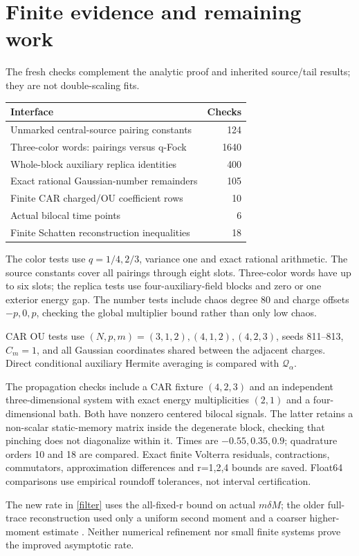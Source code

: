 \documentclass[11pt]{article}
\newcommand{\Qop}{\mathscr Q}
\begin{document}
\section{Finite evidence and remaining work}
The fresh checks complement the analytic proof and inherited
source/tail results; they are not double-scaling fits.
\begin{center}
\begin{tabular}{lr}\toprule
Interface&Checks\\\midrule
Unmarked central-source pairing constants&124\\
Three-color words: pairings versus q-Fock&1640\\
Whole-block auxiliary replica identities&400\\
Exact rational Gaussian-number remainders&105\\
Finite CAR charged/OU coefficient rows&10\\
Actual bilocal time points&6\\
Finite Schatten reconstruction inequalities&18\\\bottomrule
\end{tabular}
\end{center}
The color tests use $q=1/4,2/3$, variance one and exact rational
arithmetic. The source constants cover all pairings through
eight slots. Three-color words have up to six slots; the replica
tests use four-auxiliary-field blocks and zero or one exterior
energy gap. The number tests include chaos degree 80 and
charge offsets $-p,0,p$, checking the global multiplier bound
rather than only low chaos.

CAR OU tests use $(N,p,m)=(3,1,2),(4,1,2),(4,2,3)$,
seeds 811--813, $C_m=1$, and all Gaussian coordinates shared
between the adjacent charges. Direct conditional auxiliary
Hermite averaging is compared with $\Qop_\alpha$.

The propagation checks include a CAR fixture $(4,2,3)$ and
an independent three-dimensional system with exact energy
multiplicities $(2,1)$ and a four-dimensional bath. Both have
nonzero centered bilocal signals. The latter retains a
non-scalar static-memory matrix inside the degenerate block,
checking that pinching does not diagonalize within it.
Times are $-0.55,0.35,0.9$; quadrature orders 10 and 18 are
compared. Exact finite Volterra residuals, contractions,
commutators, approximation differences and r=1,2,4 bounds
are saved. Float64 comparisons use empirical roundoff
tolerances, not interval certification.

The new rate in \eqref{filter} uses the all-fixed-r bound on
actual $m\delta M$; the older full-trace reconstruction used
only a uniform second moment and a coarser higher-moment
estimate \cite{reconstruct}. Neither numerical refinement nor
small finite systems prove the improved asymptotic rate.
\end{document}
